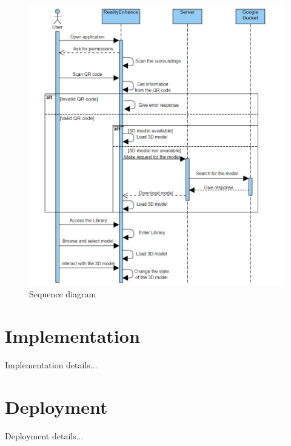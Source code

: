 \begin{figure}[ht]
    \centering
    \includegraphics[width=1\textwidth]{img/SequenceDiagram.png}
    \caption{Sequence diagram}
    \label{fig:SequenceDiagram}
\end{figure}

\clearpage

\section{Implementation}
Implementation details...

\section{Deployment}
Deployment details...
